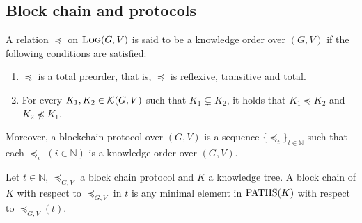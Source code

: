 
\subsection{Block chain and protocols}

\begin{mydef}
A relation $\preceq$ on $\text{\sc Log}(G,V)$ is said to be a knowledge order over $(G,V)$ if the following conditions are satisfied:
\begin{enumerate}
\item $\preceq$ is a total preorder, that is, $\preceq$ is reflexive, transitive and total.

\item For every $K_1, K_2 \in \mathcal{K}(G,V)$ such that $K_1 \subsetneq K_2$, it holds that $K_1 \preceq K_2$ and $K_2 \not\preceq K_1$.
\end{enumerate}
Moreover, a blockchain protocol over $(G,V)$ is a sequence $\{ \preceq_t\}_{t \in \mathbb{N}}$ such that each $\preceq_i$ $(i \in \mathbb{N})$ is a knowledge order over $(G,V)$.
\end{mydef}





\begin{mydef}
Let $t \in \mathbb N$, $\preceq_{G,V}$ a block chain protocol and $K$ a knowledge tree. 
A block chain of $K$ with respect to $\preceq_{G,V}$ in $t$ is any minimal element in $\text{PATHS}(K)$ with respect to $\preceq_{G,V}(t)$.
\end{mydef}

